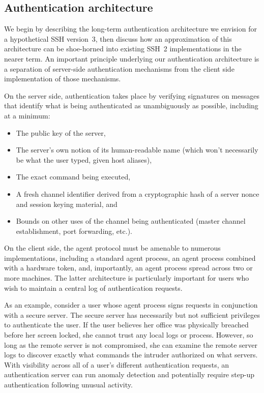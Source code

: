 \documentclass[11pt]{article}
\begin{document}
\subsection{Authentication architecture}

We begin by describing the long-term authentication architecture we
envision for a hypothetical SSH version~3, then discuss how an
approximation of this architecture can be shoe-horned into existing
SSH~2 implementations in the nearer term.  An important principle
underlying our authentication architecture is a separation of
server-side authentication mechanisms from the client side
implementation of those mechanisms.

On the server side, authentication takes place by verifying signatures
on messages that identify what is being authenticated as unambiguously
as possible, including at a minimum:
\begin{itemize}\itemsep=0pt
\item The public key of the server,
\item The server's own notion of its human-readable name (which won't
  necessarily be what the user typed, given host aliases),
\item The exact command being executed,
\item A fresh channel identifier derived from a cryptographic hash of
  a server nonce and session keying material, and
\item Bounds on other uses of the channel being authenticated (master
  channel establishment, port forwarding, etc.).
\end{itemize}

On the client side, the agent protocol must be amenable to numerous
implementations, including a standard agent process, an agent process
combined with a hardware token, and, importantly, an agent process
spread across two or more machines.  The latter architecture is
particularly important for users who wish to maintain a central log of
authentication requests.

As an example, consider a user whose agent process signs requests in
conjunction with a secure server.  The secure server has necessarily
but not sufficient privileges to authenticate the user.  If the user
believes her office was physically breached before her screen locked,
she cannot trust any local logs or process.  However, so long as the
remote server is not compromised, she can examine the remote server
logs to discover exactly what commands the intruder authorized on what
servers.  With visibility across all of a user's different
authentication requests, an authentication server can run anomaly
detection and potentially require step-up authentication following
unusual activity.
\end{document}
